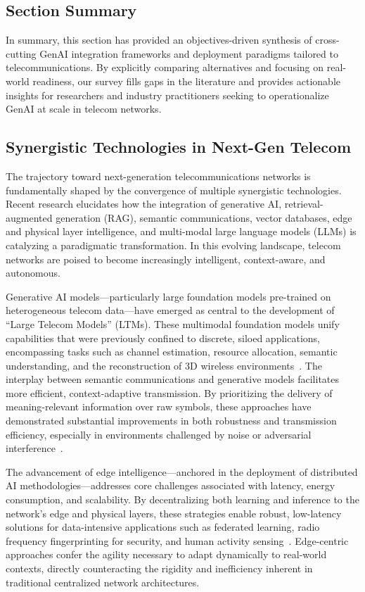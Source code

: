 \documentclass[sigconf]{acmart}
\begin{document}
\subsection{Section Summary}
In summary, this section has provided an objectives-driven synthesis of cross-cutting GenAI integration frameworks and deployment paradigms tailored to telecommunications. By explicitly comparing alternatives and focusing on real-world readiness, our survey fills gaps in the literature and provides actionable insights for researchers and industry practitioners seeking to operationalize GenAI at scale in telecom networks.

\subsection{Synergistic Technologies in Next-Gen Telecom}

The trajectory toward next-generation telecommunications networks is fundamentally shaped by the convergence of multiple synergistic technologies. Recent research elucidates how the integration of generative AI, retrieval-augmented generation (RAG), semantic communications, vector databases, edge and physical layer intelligence, and multi-modal large language models (LLMs) is catalyzing a paradigmatic transformation. In this evolving landscape, telecom networks are poised to become increasingly intelligent, context-aware, and autonomous.

Generative AI models—particularly large foundation models pre-trained on heterogeneous telecom data—have emerged as central to the development of ``Large Telecom Models'' (LTMs). These multimodal foundation models unify capabilities that were previously confined to discrete, siloed applications, encompassing tasks such as channel estimation, resource allocation, semantic understanding, and the reconstruction of 3D wireless environments~\cite{ref24}. The interplay between semantic communications and generative models facilitates more efficient, context-adaptive transmission. By prioritizing the delivery of meaning-relevant information over raw symbols, these approaches have demonstrated substantial improvements in both robustness and transmission efficiency, especially in environments challenged by noise or adversarial interference~\cite{ref20,ref26}.

The advancement of edge intelligence—anchored in the deployment of distributed AI methodologies—addresses core challenges associated with latency, energy consumption, and scalability. By decentralizing both learning and inference to the network's edge and physical layers, these strategies enable robust, low-latency solutions for data-intensive applications such as federated learning, radio frequency fingerprinting for security, and human activity sensing~\cite{ref12,ref14,ref19,ref21,ref25}. Edge-centric approaches confer the agility necessary to adapt dynamically to real-world contexts, directly counteracting the rigidity and inefficiency inherent in traditional centralized network architectures.
\end{document}
